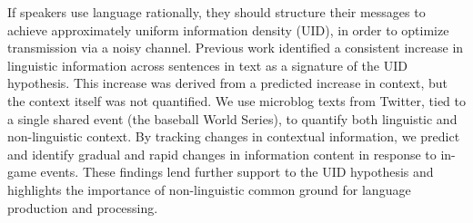 If speakers use language rationally, they should structure their messages to achieve approximately uniform information density (UID), in order to optimize transmission via a noisy channel. Previous work identified a consistent increase in linguistic information across sentences in text as a signature of the UID hypothesis. This increase was derived from a predicted increase in context, but the context itself was not quantified. We use microblog texts from Twitter, tied to a single shared event (the baseball World Series), to quantify both linguistic and non-linguistic context. By tracking changes in contextual information, we predict and identify gradual and rapid changes in information content in response to in-game events. These findings lend further support to the UID hypothesis and highlights the importance of non-linguistic common ground for language production and processing.
